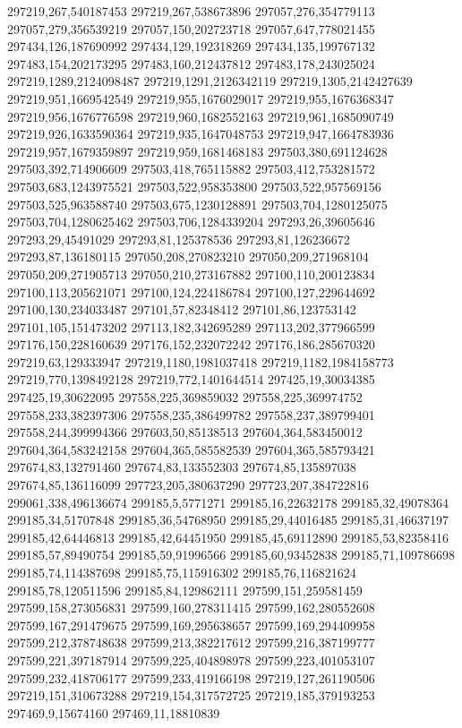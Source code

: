 297219,267,540187453
297219,267,538673896
297057,276,354779113
297057,279,356539219
297057,150,202723718
297057,647,778021455
297434,126,187690992
297434,129,192318269
297434,135,199767132
297483,154,202173295
297483,160,212437812
297483,178,243025024
297219,1289,2124098487
297219,1291,2126342119
297219,1305,2142427639
297219,951,1669542549
297219,955,1676029017
297219,955,1676368347
297219,956,1676776598
297219,960,1682552163
297219,961,1685090749
297219,926,1633590364
297219,935,1647048753
297219,947,1664783936
297219,957,1679359897
297219,959,1681468183
297503,380,691124628
297503,392,714906609
297503,418,765115882
297503,412,753281572
297503,683,1243975521
297503,522,958353800
297503,522,957569156
297503,525,963588740
297503,675,1230128891
297503,704,1280125075
297503,704,1280625462
297503,706,1284339204
297293,26,39605646
297293,29,45491029
297293,81,125378536
297293,81,126236672
297293,87,136180115
297050,208,270823210
297050,209,271968104
297050,209,271905713
297050,210,273167882
297100,110,200123834
297100,113,205621071
297100,124,224186784
297100,127,229644692
297100,130,234033487
297101,57,82348412
297101,86,123753142
297101,105,151473202
297113,182,342695289
297113,202,377966599
297176,150,228160639
297176,152,232072242
297176,186,285670320
297219,63,129333947
297219,1180,1981037418
297219,1182,1984158773
297219,770,1398492128
297219,772,1401644514
297425,19,30034385
297425,19,30622095
297558,225,369859032
297558,225,369974752
297558,233,382397306
297558,235,386499782
297558,237,389799401
297558,244,399994366
297603,50,85138513
297604,364,583450012
297604,364,583242158
297604,365,585582539
297604,365,585793421
297674,83,132791460
297674,83,133552303
297674,85,135897038
297674,85,136116099
297723,205,380637290
297723,207,384722816
299061,338,496136674
299185,5,5771271
299185,16,22632178
299185,32,49078364
299185,34,51707848
299185,36,54768950
299185,29,44016485
299185,31,46637197
299185,42,64446813
299185,42,64451950
299185,45,69112890
299185,53,82358416
299185,57,89490754
299185,59,91996566
299185,60,93452838
299185,71,109786698
299185,74,114387698
299185,75,115916302
299185,76,116821624
299185,78,120511596
299185,84,129862111
297599,151,259581459
297599,158,273056831
297599,160,278311415
297599,162,280552608
297599,167,291479675
297599,169,295638657
297599,169,294409958
297599,212,378748638
297599,213,382217612
297599,216,387199777
297599,221,397187914
297599,225,404898978
297599,223,401053107
297599,232,418706177
297599,233,419166198
297219,127,261190506
297219,151,310673288
297219,154,317572725
297219,185,379193253
297469,9,15674160
297469,11,18810839
